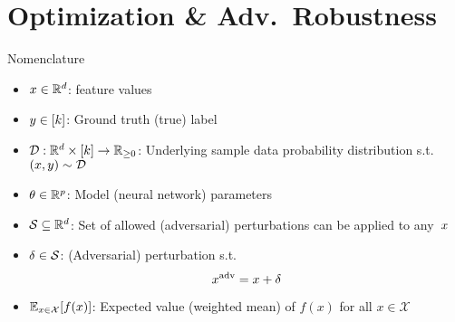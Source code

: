 \section{Optimization \& Adv.\ Robustness}


\begin{frame}{Nomenclature}
    

  \begin{itemize}[<+->]
    \setlength{\itemsep}{6pt}
    \item ${x \in \mathbb{R}^{d}}$: feature values
    \item ${y \in {\lbrack k\rbrack}}$: Ground truth (true) label
    \item ${\mathcal{D}:\mathbb{R}^{d} \times {\lbrack k\rbrack}\rightarrow\mathbb{R}_{{\geq}0}}$: Underlying sample data probability distribution s.t.\ ${(x,y) \sim \mathcal{D}}$

    \vspace{6pt}
    \item ${\theta \in \mathbb{R}^{p}}$: Model (neural network) parameters

    \vspace{6pt}
    \item ${\mathcal{S} \subseteq \mathbb{R}^{d}}$: Set of allowed (adversarial) perturbations can be applied to any~$x$
    \item ${\delta \in \mathcal{S}}$: (Adversarial) perturbation s.t.
      \begin{equation}\label{eq:AdversarialX}
        x^{\text{adv}} = x + \delta
      \end{equation}

    \vspace{6pt}
    \item $\mathbb{E}_{x \in \mathcal{X}}\lbrack f(x)\rbrack$: Expected value (weighted mean) of $f(x)$ for all ${x \in \mathcal{X}}$
  \end{itemize}
\end{frame}


